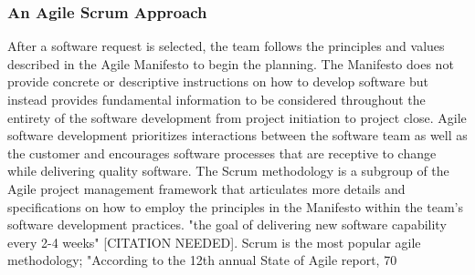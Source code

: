 \subsubsection{An Agile Scrum Approach}
After a software request is selected, the team follows the principles and values described in the Agile Manifesto to begin the planning. The Manifesto does not provide concrete or descriptive instructions on how to develop software but instead provides fundamental information to be considered throughout the entirety of the software development from project initiation to project close. Agile software development prioritizes interactions between the software team as well as the customer and encourages software processes that are receptive to change while delivering quality software. The Scrum methodology is a subgroup of the Agile project management framework that articulates more details and specifications on how to employ the principles in the Manifesto within the team's software development practices.  "the goal of delivering new software capability every 2-4 weeks" [CITATION NEEDED]. Scrum is the most popular agile methodology; "According to the 12th annual State of Agile report, 70%

